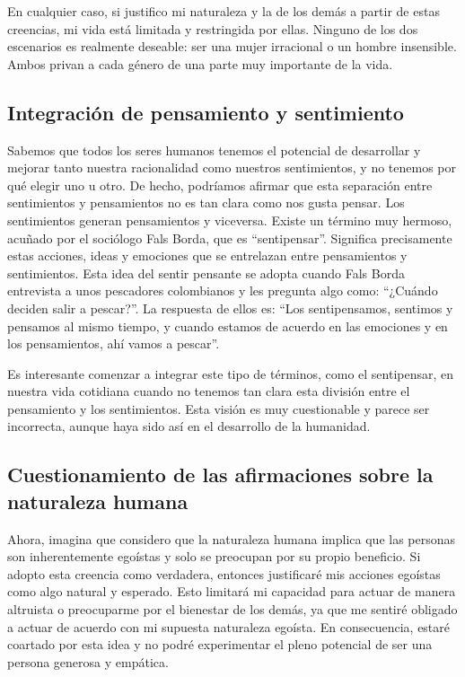 \documentclass[
  a4paper,
]{article}
\begin{document}
En cualquier caso, si justifico mi naturaleza y la de los demás a partir
de estas creencias, mi vida está limitada y restringida por ellas.
Ninguno de los dos escenarios es realmente deseable: ser una mujer
irracional o un hombre insensible. Ambos privan a cada género de una
parte muy importante de la vida.

\subsection{Integración de pensamiento y
sentimiento}\label{integraciuxf3n-de-pensamiento-y-sentimiento}

Sabemos que todos los seres humanos tenemos el potencial de desarrollar
y mejorar tanto nuestra racionalidad como nuestros sentimientos, y no
tenemos por qué elegir uno u otro. De hecho, podríamos afirmar que esta
separación entre sentimientos y pensamientos no es tan clara como nos
gusta pensar. Los sentimientos generan pensamientos y viceversa. Existe
un término muy hermoso, acuñado por el sociólogo Fals Borda, que es
``sentipensar''. Significa precisamente estas acciones, ideas y
emociones que se entrelazan entre pensamientos y sentimientos. Esta idea
del sentir pensante se adopta cuando Fals Borda entrevista a unos
pescadores colombianos y les pregunta algo como: ``¿Cuándo deciden salir
a pescar?''. La respuesta de ellos es: ``Los sentipensamos, sentimos y
pensamos al mismo tiempo, y cuando estamos de acuerdo en las emociones y
en los pensamientos, ahí vamos a pescar''.

Es interesante comenzar a integrar este tipo de términos, como el
sentipensar, en nuestra vida cotidiana cuando no tenemos tan clara esta
división entre el pensamiento y los sentimientos. Esta visión es muy
cuestionable y parece ser incorrecta, aunque haya sido así en el
desarrollo de la humanidad.

\subsection{Cuestionamiento de las afirmaciones sobre la naturaleza
humana}\label{cuestionamiento-de-las-afirmaciones-sobre-la-naturaleza-humana}

Ahora, imagina que considero que la naturaleza humana implica que las
personas son inherentemente egoístas y solo se preocupan por su propio
beneficio. Si adopto esta creencia como verdadera, entonces justificaré
mis acciones egoístas como algo natural y esperado. Esto limitará mi
capacidad para actuar de manera altruista o preocuparme por el bienestar
de los demás, ya que me sentiré obligado a actuar de acuerdo con mi
supuesta naturaleza egoísta. En consecuencia, estaré coartado por esta
idea y no podré experimentar el pleno potencial de ser una persona
generosa y empática.
\end{document}
